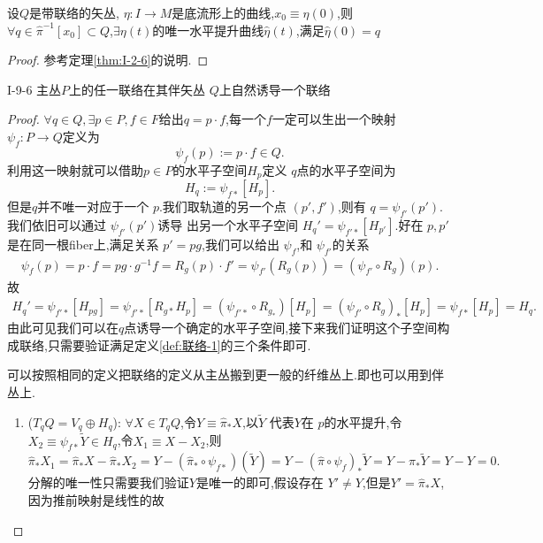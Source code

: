 \documentclass[../main.tex]{subfiles}
\begin{document}
\begin{theorem}
  设$Q$是带联络的矢丛, $ \eta: I\to M$是底流形上的曲线,$x_0 \equiv \eta(0)$,则 $\forall q \in \hat{\pi}^{-1}[x_0] \subset Q$,$\exists \eta(t)$的唯一水平提升曲线$\hat{\eta}(t)$,满足$\hat{\eta}(0) = q$
\end{theorem}
\begin{proof}
  参考定理\ref{thm:I-2-6}的说明.
\end{proof}
\begin{theorem}
  {}{I-9-6}
  主丛$P$上的任一联络在其伴矢丛 $Q$上自然诱导一个联络
\end{theorem}
\begin{proof}
  $\forall q \in Q, \exists p \in P, f\in F$给出$q = p \cdot f$,每一个$f$一定可以生出一个映射 $\psi_f:P \to Q$定义为\[
 \psi_f(p) := p \cdot f \in Q 
  .\] 
  利用这一映射就可以借助$p \in P$的水平子空间$H_p$定义 $q$点的水平子空间为 \[
    H_q := \psi_{f*}[H_p] 
  .\] 
  但是$q$并不唯一对应于一个 $p$.我们取轨道的另一个点 $(p',f')$,则有 $q = \psi_{f'}(p')$.我们依旧可以通过 $\psi_{f'}(p')$诱导
  出另一个水平子空间 $H_q' = \psi_{f'*}[H_{p'}]$.好在 $p,p'$是在同一根fiber上,满足关系 $ p' = pg$,我们可以给出 $\psi_f$,和
  $\psi_{f'}$的关系
   \begin{align*}
     \psi_f(p) = p \cdot f = pg \cdot g^{-1} f = R_g(p) \cdot f' = \psi_{f'}(R_g(p)) = (\psi_{f'}\circ R_g)(p)
  .\end{align*}
  故
  \begin{align*}
    H_q' = \psi_{f'*}[H_{pg}] = \psi_{f'*}[R_{g*} H_p] = (\psi_{f'*} \circ R_{g_*})[H_p] = (\psi_{f'} \circ R_g)_*[H_p] = \psi_{f*}[H_p] = H_q
  .\end{align*}
   由此可见我们可以在$q$点诱导一个确定的水平子空间,接下来我们证明这个子空间构成联络,只需要验证满足定义\ref{def:联络-1}的三个条件即可.
  \begin{note}
   可以按照相同的定义把联络的定义从主丛搬到更一般的纤维丛上.即也可以用到伴丛上.
   \end{note}
  \begin{enumerate}
    \item  ($T_qQ = V_q \oplus H_q$): $\forall X \in T_qQ$,令$Y \equiv \hat{\pi}_*X$,以$\tilde{Y}$ 代表$Y$在 $p$的水平提升,令 $X_2 \equiv \psi_{f*} \tilde{Y} \in H_q$,令$X_1 \equiv X - X_2$,则\[
        \hat{\pi}_{*}X_1 = \hat{\pi}_{*}X - \hat{\pi}_{*}X_2 =  Y - (\hat{\pi}_{*} \circ \psi_{f*})(\tilde{Y}) = Y - (\hat{\pi}\circ \psi_f)_* \tilde{Y} = Y - \pi_* \tilde{Y} = Y-Y = 0
    .\] 
    分解的唯一性只需要我们验证$Y$是唯一的即可,假设存在 $Y' \neq Y$,但是$Y' = \hat{\pi}_*X$,因为推前映射是线性的故

\end{enumerate}
\end{proof}
\end{document}
